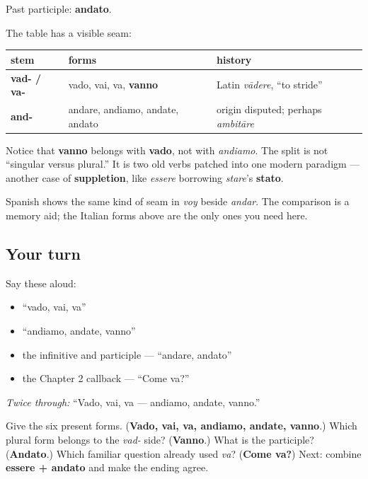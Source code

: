 Past participle: \textbf{andato}.

The table has a visible seam:

\noindent
\begin{tabularx}{\linewidth}{@{}>{\raggedright\arraybackslash}X>{\raggedright\arraybackslash}X>{\raggedright\arraybackslash}X@{}}
\toprule
\textbf{stem} & \textbf{forms} & \textbf{history} \\
\midrule
\textbf{vad- / va-} & vado, vai, va, \textbf{vanno} & Latin \emph{vādere}, “to stride” \\
\textbf{and-} & andare, andiamo, andate, andato & origin disputed; perhaps \emph{ambitāre} \\
\bottomrule
\end{tabularx}

Notice that \textbf{vanno} belongs with \textbf{vado}, not with \emph{andiamo}. The split is not “singular versus plural.” It is two old verbs patched into one modern paradigm — another case of \textbf{suppletion}, like \emph{essere} borrowing \emph{stare}’s \textbf{stato}.

Spanish shows the same kind of seam in \emph{voy} beside \emph{andar}. The comparison is a memory aid; the Italian forms above are the only ones you need here.

\subsection*{Your turn}
Say these aloud:

\begin{itemize}
\raggedright
  \item “vado, vai, va”
  \item “andiamo, andate, vanno”
  \item the infinitive and participle — “andare, andato”
  \item the Chapter 2 callback — “Come va?”
\end{itemize}

\emph{Twice through:} “Vado, vai, va — andiamo, andate, vanno.”

\begin{tcolorbox}[breakable,colback=teal!4,colframe=teal!35!black,title={Before you move on}]
Give the six present forms. (\textbf{Vado, vai, va, andiamo, andate, vanno}.) Which plural form belongs to the \emph{vad-} side? (\textbf{Vanno}.) What is the participle? (\textbf{Andato}.) Which familiar question already used \emph{va}? (\textbf{Come va?}) Next: combine \textbf{essere + andato} and make the ending agree.
\end{tcolorbox}
